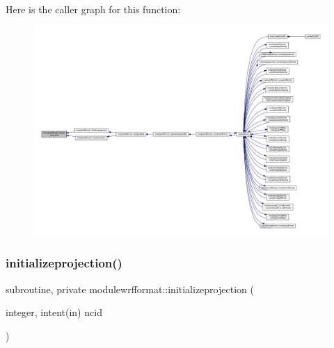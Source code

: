 Here is the caller graph for this function\+:\nopagebreak
\begin{figure}[H]
\begin{center}
\leavevmode
\includegraphics[width=350pt]{namespacemodulewrfformat_ae7878b44cc094aa060425acf8605dc33_icgraph}
\end{center}
\end{figure}
\mbox{\label{namespacemodulewrfformat_a4a00c0e3d836f215b0275950c3cc307c}} 
\subsubsection{\texorpdfstring{initializeprojection()}{initializeprojection()}}
{\footnotesize\ttfamily subroutine, private modulewrfformat\+::initializeprojection (\begin{DoxyParamCaption}\item[{integer, intent(in)}]{ncid }\end{DoxyParamCaption})\hspace{0.3cm}{\ttfamily [private]}}

